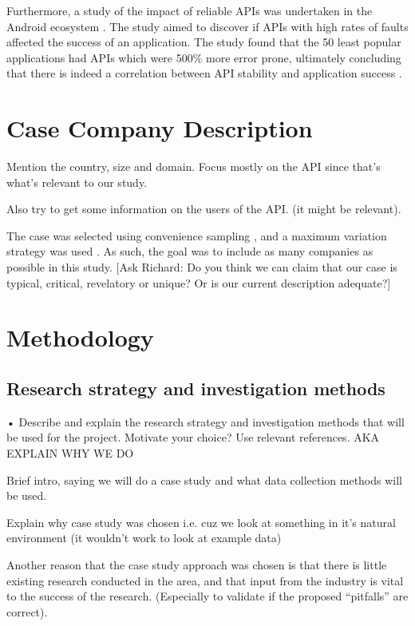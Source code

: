 \documentclass[10pt,twocolumn]{article}
\begin{document}
Furthermore, a study of the impact of reliable APIs was undertaken in the Android ecosystem \cite{mcdonnell2013empirical}. The study aimed to discover if APIs with high rates of faults affected the success of an application. The study found that the 50 least popular applications had APIs which were 500\% more error prone, ultimately concluding that there is indeed a correlation between API stability and application success \cite{mcdonnell2013empirical}. 

\section{Case Company Description}
Mention the country, size and domain. 
Focus mostly on the API since that's what's relevant to our study. 

Also try to get some information on the users of the API. (it might be relevant).

The case was selected using convenience sampling \cite{flyvbjerg2006five}, and a maximum variation strategy was used \cite{benbasat1987case}. As such, the goal was to include as many companies as possible in this study. [Ask Richard: Do you think we can claim that our case is typical, critical, revelatory or unique? Or is our current description adequate?]


\section{Methodology}

\subsection{Research strategy and investigation methods}
• Describe and explain the research strategy and investigation methods that will be used for the project. Motivate your choice? Use relevant references.
AKA EXPLAIN WHY WE DO 


Brief intro, saying we will do a case study \cite{runeson2009guidelines} and what data collection methods will be used. 

Explain why case study was chosen i.e. cuz we look at something in it's natural environment (it wouldn't work to look at example data)

Another reason that the case study approach was chosen is that there is little existing research conducted in the area, and that input from the industry is vital to the success of the research. (Especially to validate if the proposed ``pitfalls''  are correct).
\end{document}
